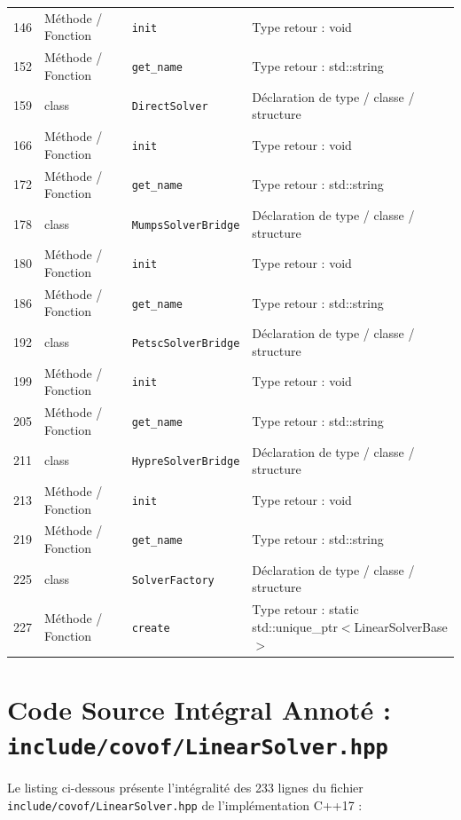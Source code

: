 \documentclass[10pt,a4paper,oneside]{book}
\begin{document}
\begin{center}
\begin{tabular}{clll}
146 & Méthode / Fonction & \texttt{init} & Type retour : void \\
152 & Méthode / Fonction & \texttt{get\_name} & Type retour : std::string \\
159 & class & \texttt{DirectSolver} & Déclaration de type / classe / structure \\
166 & Méthode / Fonction & \texttt{init} & Type retour : void \\
172 & Méthode / Fonction & \texttt{get\_name} & Type retour : std::string \\
178 & class & \texttt{MumpsSolverBridge} & Déclaration de type / classe / structure \\
180 & Méthode / Fonction & \texttt{init} & Type retour : void \\
186 & Méthode / Fonction & \texttt{get\_name} & Type retour : std::string \\
192 & class & \texttt{PetscSolverBridge} & Déclaration de type / classe / structure \\
199 & Méthode / Fonction & \texttt{init} & Type retour : void \\
205 & Méthode / Fonction & \texttt{get\_name} & Type retour : std::string \\
211 & class & \texttt{HypreSolverBridge} & Déclaration de type / classe / structure \\
213 & Méthode / Fonction & \texttt{init} & Type retour : void \\
219 & Méthode / Fonction & \texttt{get\_name} & Type retour : std::string \\
225 & class & \texttt{SolverFactory} & Déclaration de type / classe / structure \\
227 & Méthode / Fonction & \texttt{create} & Type retour : static std::unique\_ptr$<$LinearSolverBase$>$ \\
\bottomrule
\end{tabular}
\end{center}

\section{Code Source Intégral Annoté : \texttt{include/covof/LinearSolver.hpp}}
Le listing ci-dessous présente l'intégralité des 233 lignes du fichier \texttt{include/covof/LinearSolver.hpp} de l'implémentation C++17 :
\end{document}
